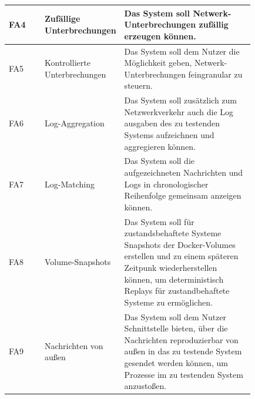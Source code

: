 \documentclass[12pt,a4paper]{report}
\begin{document}
\begin{longtable}[H]{|p{}|p{0.3\linewidth}|p{0.53\linewidth}|}
	FA4  & Zufällige Unterbrechungen     & Das System soll Netwerk-Unterbrechungen zufällig erzeugen können.                                                                                                                                                                                                                                                                                                                                         \\ \hline
	FA5  & Kontrollierte Unterbrechungen & Das System soll dem Nutzer die Möglichkeit geben, Netwerk-Unterbrechungen feingranular zu steuern.                                                                                                                                                                                                                                                                                                        \\ \hline
	FA6  & Log-Aggregation               & Das System soll zusätzlich zum Netzwerkverkehr auch die Log ausgaben des zu testenden Systems aufzeichnen und aggregieren können.                                                                                                                                                                                                                                                                         \\ \hline
	FA7  & Log-Matching                  & Das System soll die aufgezeichneten Nachrichten und Logs in chronologischer Reihenfolge gemeinsam anzeigen können.                                                                                                                                                                                                                                                                                        \\ \hline
	FA8  & Volume-Snapshots              & Das System soll für zustandsbehaftete Systeme Snapshots der Docker-Volumes erstellen und zu einem späteren Zeitpunk wiederherstellen können, um deterministisch Replays für zustandbehaftete Systeme zu ermöglichen.                                                                                                                                                                                      \\ \hline
	FA9  & Nachrichten von außen         & Das System soll dem Nutzer Schnittstelle bieten, über die Nachrichten reproduzierbar von außen in das zu testende System gesendet werden können, um Prozesse im zu testenden System anzustoßen.                                                                                                                                                                                                           \\ \hline

\end{longtable}
\end{document}
